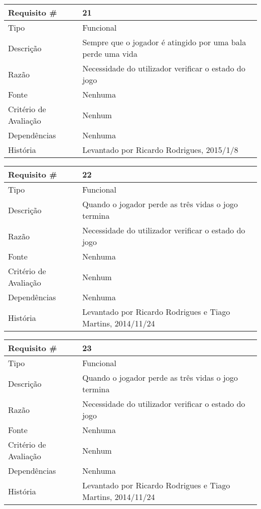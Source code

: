 \begin{tabular} {|l|p{8cm}|} 
\hline
Requisito \# & 21 \\
\hline
Tipo & Funcional \\
\hline
Descrição & Sempre que o jogador é atingido por uma bala perde uma vida \\
\hline
Razão & Necessidade do utilizador verificar o estado do jogo \\
\hline
Fonte & Nenhuma \\
\hline
Critério de Avaliação & Nenhum \\
\hline
Dependências & Nenhuma \\
\hline
História & Levantado por Ricardo Rodrigues, 2015/1/8 \\
\hline
\end{tabular}

\begin{tabular} {|l|p{8cm}|} 
\hline
Requisito \# & 22 \\
\hline
Tipo & Funcional \\
\hline
Descrição & Quando o jogador perde as três vidas o jogo termina \\
\hline
Razão & Necessidade do utilizador verificar o estado do jogo \\
\hline
Fonte & Nenhuma \\
\hline
Critério de Avaliação & Nenhum \\
\hline
Dependências & Nenhuma \\
\hline
História & Levantado por Ricardo Rodrigues e Tiago Martins, 2014/11/24 \\
\hline
\end{tabular}

\begin{tabular} {|l|p{8cm}|} 
\hline
Requisito \# & 23 \\
\hline
Tipo & Funcional \\
\hline
Descrição & Quando o jogador perde as três vidas o jogo termina \\
\hline
Razão & Necessidade do utilizador verificar o estado do jogo \\
\hline
Fonte & Nenhuma \\
\hline
Critério de Avaliação & Nenhum \\
\hline
Dependências & Nenhuma \\
\hline
História & Levantado por Ricardo Rodrigues e Tiago Martins, 2014/11/24 \\
\hline
\end{tabular}

